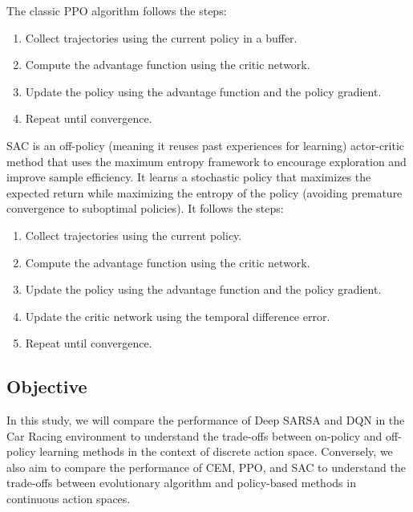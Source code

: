 \documentclass[../CSC_52081_EP.tex]{subfiles}
\begin{document}
    The classic PPO algorithm follows the steps:
    \begin{enumerate}
        \item Collect trajectories using the current policy in a buffer.
        \item Compute the advantage function using the critic network.
        \item Update the policy using the advantage function and the policy gradient.
        \item Repeat until convergence.
    \end{enumerate}


    SAC is an off-policy (meaning it reuses past experiences for learning) actor-critic method that uses the maximum entropy framework to encourage exploration and improve sample efficiency. It learns a stochastic policy that maximizes the expected return while maximizing the entropy of the policy (avoiding premature convergence to suboptimal policies). It follows the steps:
    \begin{enumerate}
        \item Collect trajectories using the current policy.
        \item Compute the advantage function using the critic network.
        \item Update the policy using the advantage function and the policy gradient.
        \item Update the critic network using the temporal difference error.
        \item Repeat until convergence.
    \end{enumerate}

    \subsection{Objective}
    In this study, we will compare the performance of Deep SARSA and DQN in the Car Racing environment to understand the trade-offs between on-policy and off-policy learning methods in the context of discrete action space. Conversely, we also aim to compare the performance of CEM, PPO, and SAC to understand the trade-offs between evolutionary algorithm and policy-based methods in continuous action spaces.
\end{document}
